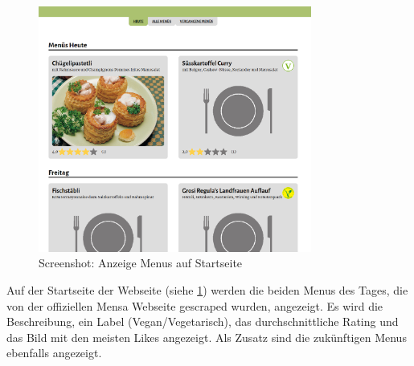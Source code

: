 \begin{figure}[ht]
    \centering
    \includegraphics[width=0.8\textwidth]{images/Resultate_Menu.png}
    \caption{Screenshot: Anzeige Menus auf Startseite}
    \label{fig:r-menuindex}
\end{figure}

Auf der Startseite der Webseite (siehe \ref{fig:r-menuindex}) werden die beiden Menus des Tages, die von der
offiziellen Mensa Webseite gescraped wurden, angezeigt. Es wird die
Beschreibung, ein Label (Vegan/Vegetarisch), das durchschnittliche Rating und
das Bild mit den meisten Likes angezeigt. Als Zusatz sind die zukünftigen Menus
ebenfalls angezeigt.

